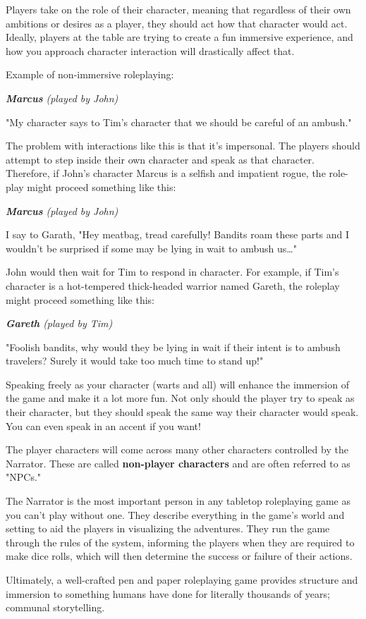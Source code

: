 Players take on the role of their character, meaning that regardless of their own ambitions or desires as a player, they should act how that character would act. Ideally, players at the table are trying to create a fun immersive experience, and how you approach character interaction will drastically affect that.

Example of non-immersive roleplaying:

\begin{displayquote}
\textit{\textbf{Marcus} (played by John)}

"My character says to Tim's character that we should be careful of an ambush."
\end{displayquote}


The problem with interactions like this is that it's impersonal. The players should attempt to step inside their own character and speak as that character. Therefore, if John's character Marcus is a selfish and impatient rogue, the role-play might proceed something like this:

\begin{displayquote}
    \textit{\textbf{Marcus} (played by John)}
    
    I say to Garath, "Hey meatbag, tread carefully! Bandits roam these parts and I wouldn't be surprised if some may be lying in wait to ambush us…"
\end{displayquote}

John would then wait for Tim to respond in character. For example, if Tim's character is a hot-tempered thick-headed warrior named Gareth, the roleplay might proceed something like this:

\begin{displayquote}
    \textit{\textbf{Gareth} (played by Tim)}
    
    "Foolish bandits, why would they be lying in wait if their intent is to ambush travelers? Surely it would take too much time to stand up!"
\end{displayquote}

Speaking freely as your character (warts and all) will enhance the immersion of the game and make it a lot more fun. Not only should the player try to speak as their character, but they should speak the same way their character would speak. You can even speak in an accent if you want!

The player characters will come across many other characters controlled by the Narrator. These are called \textbf{non-player characters} and are often referred to as "NPCs."

The Narrator is the most important person in any tabletop roleplaying game as you can't play without one. They describe everything in the game's world and setting to aid the players in visualizing the adventures. They run the game through the rules of the system, informing the players when they are required to make dice rolls, which will then determine the success or failure of their actions.

Ultimately, a well-crafted pen and paper roleplaying game provides structure and immersion to something humans have done for literally thousands of years; communal storytelling.
